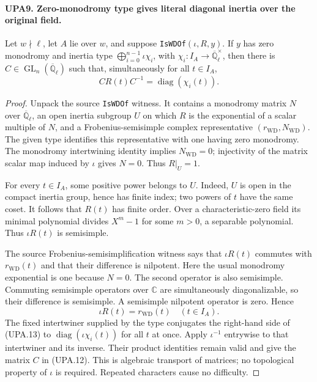 \paragraph{UPA9. Zero-monodromy type gives literal diagonal inertia over the original field.}
\label{claim:UPA9}
Let $w\nmid\ell$, let $A$ lie over $w$, and suppose
\texttt{IsWDOf}$(\iota,R,y)$.
If $y$ has zero monodromy and inertia type
$\bigoplus_{i=0}^{n-1}\iota\chi_i$, with
$\chi_i:I_A\to\overline{\mathbb Q}_\ell^\times$,
then there is $C\in\operatorname{GL}_n(\overline{\mathbb Q}_\ell)$
such that, simultaneously for all $t\in I_A$,
\[
               C R(t) C^{-1}=\operatorname{diag}(\chi_i(t)).
 \tag{UPA.12}
\]
\begin{proof}
Unpack the source \texttt{IsWDOf} witness.  It contains a
monodromy matrix $N$ over $\overline{\mathbb Q}_\ell$, an
open inertia subgroup $U$ on which $R$ is the exponential
of a scalar multiple of $N$, and a Frobenius-semisimple
complex representative $(r_{\mathrm{WD}},N_{\mathrm{WD}})$.
The given type identifies this representative with one
having zero monodromy.  The monodromy intertwining
identity implies $N_{\mathrm{WD}}=0$; injectivity of the
matrix scalar map induced by $\iota$ gives $N=0$.
Thus $R|_U=1$.

For every $t\in I_A$, some positive power belongs to $U$.
Indeed, $U$ is open in the compact inertia group, hence
has finite index; two powers of $t$ have the same coset.
It follows that $R(t)$ has finite order.  Over a
characteristic-zero field its minimal polynomial divides
$X^m-1$ for some $m>0$, a separable polynomial.
Thus $\iota R(t)$ is semisimple.

The source Frobenius-semisimplification witness says that
$\iota R(t)$ commutes with $r_{\mathrm{WD}}(t)$ and that
their difference is nilpotent.  Here the usual monodromy
exponential is one because $N=0$.
The second operator is also semisimple.  Commuting
semisimple operators over $\mathbb C$ are simultaneously
diagonalizable, so their difference is semisimple.
A semisimple nilpotent operator is zero.  Hence
\[
                   \iota R(t)=r_{\mathrm{WD}}(t)
                   \quad(t\in I_A).                         \tag{UPA.13}
\]
The fixed intertwiner supplied by the type conjugates
the right-hand side of (UPA.13) to
$\operatorname{diag}(\iota\chi_i(t))$ for all $t$ at once.
Apply $\iota^{-1}$ entrywise to that intertwiner and its
inverse.  Their product identities remain valid and give
the matrix $C$ in (UPA.12).
This is algebraic transport of matrices; no topological
property of $\iota$ is required.  Repeated characters cause
no difficulty.
\end{proof}

